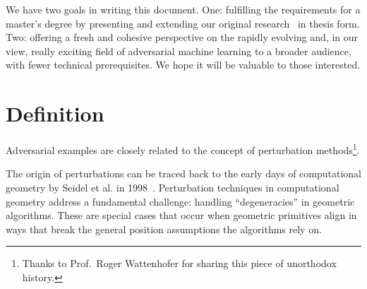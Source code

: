 \documentclass[a4paper, oneside]{discothesis}
\begin{document}
We have two goals in writing this document. One: fulfilling the requirements for a master's degree by presenting and extending our original research~\cite{jabary2024seeing} in thesis form. Two: offering a fresh and cohesive perspective on the rapidly evolving and, in our view, really exciting field of adversarial machine learning to a broader audience, with fewer technical prerequisites. We hope it will be valuable to those interested.

\section{Definition}

Adversarial examples are closely related to the concept of perturbation methods\footnote{Thanks to Prof.\ Roger Wattenhofer for sharing this piece of unorthodox history.}.

The origin of perturbations can be traced back to the early days of computational geometry by Seidel et al. in 1998~\cite{seidel1998nature}. Perturbation techniques in computational geometry address a fundamental challenge: handling ``degeneracies'' in geometric algorithms. These are special cases that occur when geometric primitives align in ways that break the general position assumptions the algorithms rely on.
\end{document}
